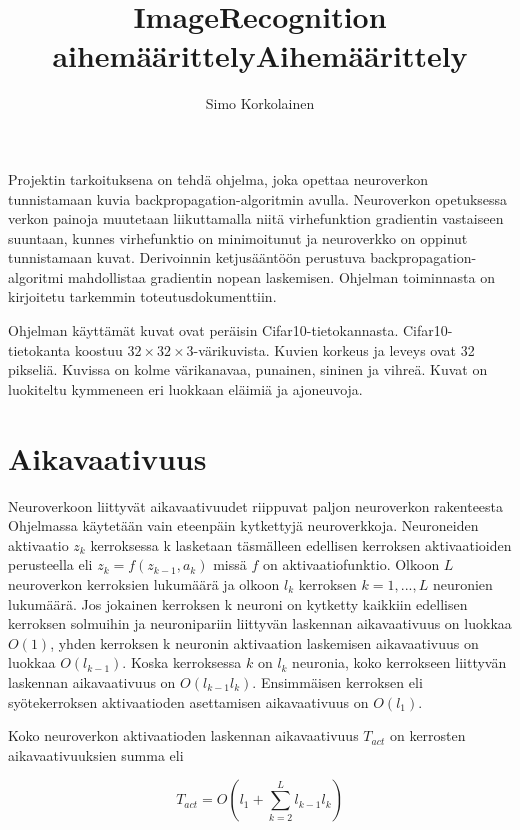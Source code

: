 \documentclass[11pt]{article}
\author{Simo Korkolainen}
\title{ImageRecognition aihemäärittely}
\begin{document}
  \maketitle



\title{Aihemäärittely}

Projektin tarkoituksena on tehdä ohjelma, joka opettaa neuroverkon tunnistamaan kuvia backpropagation-algoritmin avulla. Neuroverkon opetuksessa verkon painoja muutetaan liikuttamalla niitä virhefunktion gradientin vastaiseen suuntaan, kunnes virhefunktio on minimoitunut ja neuroverkko on oppinut tunnistamaan kuvat. Derivoinnin ketjusääntöön perustuva backpropagation-algoritmi mahdollistaa gradientin nopean laskemisen. Ohjelman toiminnasta on kirjoitetu tarkemmin toteutusdokumenttiin.

Ohjelman käyttämät kuvat ovat peräisin Cifar10-tietokannasta. Cifar10-tietokanta koostuu $32\times 32 \times 3$-värikuvista. Kuvien korkeus ja leveys ovat 32 pikseliä. Kuvissa on kolme värikanavaa, punainen, sininen ja vihreä. Kuvat on luokiteltu kymmeneen eri luokkaan eläimiä ja ajoneuvoja.


\section*{Aikavaativuus}

Neuroverkoon liittyvät aikavaativuudet riippuvat paljon neuroverkon rakenteesta
Ohjelmassa käytetään vain eteenpäin kytkettyjä neuroverkkoja. Neuroneiden aktivaatio $z_k$ kerroksessa k lasketaan täsmälleen edellisen kerroksen aktivaatioiden perusteella eli $z_k = f(z_{k - 1}, a_k)$ missä $f$ on aktivaatiofunktio. Olkoon $L$ neuroverkon kerroksien lukumäärä ja olkoon $l_k$ kerroksen $k = 1, ..., L$ neuronien lukumäärä. Jos jokainen kerroksen k neuroni on kytketty kaikkiin edellisen kerroksen solmuihin ja neuronipariin liittyvän laskennan aikavaativuus on luokkaa $O(1)$, yhden kerroksen k neuronin aktivaation laskemisen aikavaativuus on luokkaa $O(l_{k - 1})$. Koska kerroksessa $k$ on $l_k$ neuronia, koko kerrokseen liittyvän laskennan aikavaativuus on $O(l_{k - 1} l_k)$. Ensimmäisen kerroksen eli syötekerroksen aktivaatioden asettamisen aikavaativuus on $O(l_1)$.

Koko neuroverkon aktivaatioden laskennan aikavaativuus $T_{act}$ on kerrosten aikavaativuuksien summa eli

\begin{equation*}
T_{act} = O(l_1  + \sum_{k = 2}^{L}l_{k-1} l_k)
\end{equation*}
\end{document}
